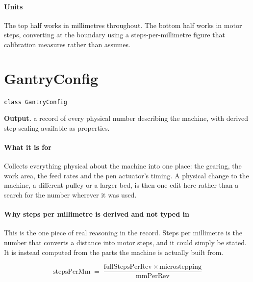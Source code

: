 \paragraph{Units}
The top half works in millimetres throughout. The bottom half works in motor steps, converting at the boundary using a steps-per-millimetre figure that calibration measures rather than assumes.


\section{GantryConfig}
\begin{lstlisting}[style=sig]
class GantryConfig
\end{lstlisting}

\noindent\textbf{Output.} a record of every physical number describing the machine, with derived step scaling available as properties.


\paragraph{What it is for}
Collects everything physical about the machine into one place: the gearing, the work area, the feed rates and the pen actuator's timing. A physical change to the machine, a different pulley or a larger bed, is then one edit here rather than a search for the number wherever it was used.


\paragraph{Why steps per millimetre is derived and not typed in}
This is the one piece of real reasoning in the record. Steps per millimetre is the number that converts a distance into motor steps, and it could simply be stated. It is instead computed from the parts the machine is actually built from.


\begin{equation}
\mathrm{stepsPerMm} \;=\; \frac{\mathrm{fullStepsPerRev} \times \mathrm{microstepping}}{\mathrm{mmPerRev}}
\end{equation}

